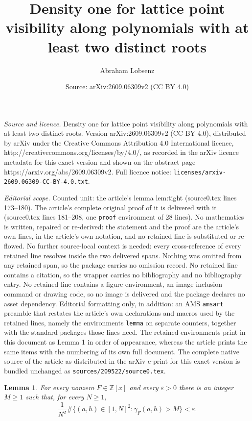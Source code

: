\documentclass[10pt,a4paper]{amsart}
\title{Density one for lattice point visibility along polynomials with at least two distinct roots}
\author{Abraham Lobsenz}
\date{Source: arXiv:2609.06309v2 (CC BY 4.0)}
\newtheorem{lemma}{Lemma}
\newcommand{\Z}{\mathbb{Z}}
\begin{document}
\maketitle

\noindent\emph{Source and licence.} Density one for lattice point visibility along polynomials with at least two distinct roots. Version arXiv:2609.06309v2 (CC BY 4.0), distributed by arXiv under the Creative Commons Attribution 4.0 International licence, http://creativecommons.org/licenses/by/4.0/, as recorded in the arXiv licence metadata for this exact version and shown on the abstract page https://arxiv.org/abs/2609.06309v2. Full licence notice: \texttt{licenses/arxiv-2609.06309-CC-BY-4.0.txt}.\par\smallskip

\noindent\textit{Editorial scope.} Counted unit: the article's lemma lem:tight (source0.tex lines 173--180). The article's complete original proof of it is delivered with it (source0.tex lines 181--208, one \texttt{proof} environment of 28 lines). No mathematics is written, repaired or re-derived: the statement and the proof are the article's own lines, in the article's own notation, and no retained line is substituted or re-flowed.  No further source-local context is needed: every cross-reference of every retained line resolves inside the two delivered spans.  Nothing was omitted from any retained span, so the package carries no omission record.  No retained line contains a citation, so the wrapper carries no bibliography and no bibliography entry.  No retained line contains a figure environment, an image-inclusion command or drawing code, so no image is delivered and the package declares no asset dependency.  Editorial formatting only, in addition: an AMS \texttt{amsart} preamble that restates the article's own declarations and macros used by the retained lines, namely the environments \texttt{lemma} on separate counters, together with the standard packages those lines need.  The retained environments print in this document as Lemma 1 in order of appearance, whereas the article prints the same items with the numbering of its own full document.  The complete native source of the article as distributed in the arXiv e-print for this exact version is bundled unchanged as \texttt{sources/209522/source0.tex}.
\begin{lemma}\label{lem:tight}
For every nonzero $F\in\Z[x]$ and every $\varepsilon>0$ there is an
integer $M\geq1$ such that, for every $N\geq1$,
\[
 \frac1{N^2}
 \#\{(a,h)\in[1,N]^2:\gamma_F(a,h)>M\}<\varepsilon.
\]
\end{lemma}
\end{document}
